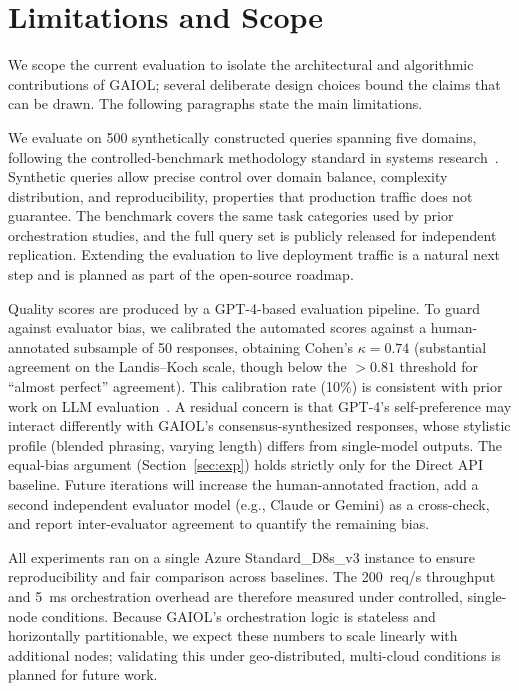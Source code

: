 \documentclass{iopjournal}
\begin{document}
\section{Limitations and Scope}
\label{sec:limitations}

We scope the current evaluation to isolate the architectural and algorithmic contributions of GAIOL; several deliberate design choices bound the claims that can be drawn. The following paragraphs state the main limitations.

We evaluate on 500 synthetically constructed queries spanning five domains, following the controlled-benchmark methodology standard in systems research~\cite{HolisticEval}. Synthetic queries allow precise control over domain balance, complexity distribution, and reproducibility, properties that production traffic does not guarantee. The benchmark covers the same task categories used by prior orchestration studies, and the full query set is publicly released for independent replication. Extending the evaluation to live deployment traffic is a natural next step and is planned as part of the open-source roadmap.

Quality scores are produced by a GPT-4-based evaluation pipeline. To guard against evaluator bias, we calibrated the automated scores against a human-annotated subsample of 50 responses, obtaining Cohen's $\kappa = 0.74$ (substantial agreement on the Landis--Koch scale, though below the $> 0.81$ threshold for ``almost perfect'' agreement). This calibration rate (10\%) is consistent with prior work on LLM evaluation~\cite{HolisticEval}. A residual concern is that GPT-4's self-preference may interact differently with GAIOL's consensus-synthesized responses, whose stylistic profile (blended phrasing, varying length) differs from single-model outputs. The equal-bias argument (Section~\ref{sec:exp}) holds strictly only for the Direct API baseline. Future iterations will increase the human-annotated fraction, add a second independent evaluator model (e.g., Claude or Gemini) as a cross-check, and report inter-evaluator agreement to quantify the remaining bias.

All experiments ran on a single Azure Standard\_D8s\_v3 instance to ensure reproducibility and fair comparison across baselines. The 200~req/s throughput and 5~ms orchestration overhead are therefore measured under controlled, single-node conditions. Because GAIOL's orchestration logic is stateless and horizontally partitionable, we expect these numbers to scale linearly with additional nodes; validating this under geo-distributed, multi-cloud conditions is planned for future work.
\end{document}
